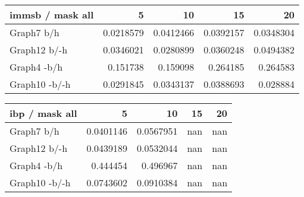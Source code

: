 \begin{table*} 
	\begin{minipage}[h]{0.45\linewidth}
\begin{tabular}{lrrrr}
\hline
 immsb / mask all   &         5 &        10 &        15 &        20 \\
\hline
 Graph7 b/h         & 0.0218579 & 0.0412466 & 0.0392157 & 0.0348304 \\
 Graph12 b/-h       & 0.0346021 & 0.0280899 & 0.0360248 & 0.0494382 \\
 Graph4 -b/h        & 0.151738  & 0.159098  & 0.264185  & 0.264583  \\
 Graph10 -b/-h      & 0.0291845 & 0.0343137 & 0.0388693 & 0.028884  \\
\hline
\end{tabular}
\end{minipage}
\hspace{0.5cm}
\begin{minipage}[h]{0.45\linewidth}
\begin{tabular}{lrrrr}
\hline
 ibp / mask all   &         5 &        10 &   15 &   20 \\
\hline
 Graph7 b/h       & 0.0401146 & 0.0567951 &  nan &  nan \\
 Graph12 b/-h     & 0.0439189 & 0.0532044 &  nan &  nan \\
 Graph4 -b/h      & 0.444454  & 0.496967  &  nan &  nan \\
 Graph10 -b/-h    & 0.0743602 & 0.0910384 &  nan &  nan \\
\hline
\end{tabular}
\end{minipage}
\end{table*}

